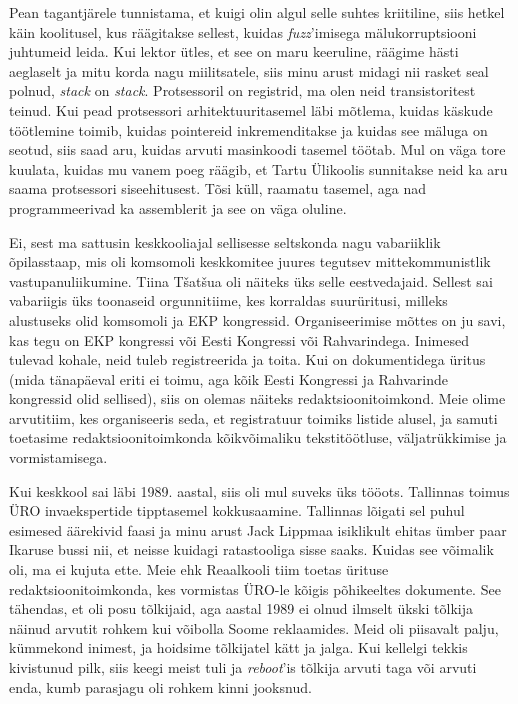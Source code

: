 Pean tagantjärele tunnistama, et kuigi olin algul selle suhtes 
kriitiline, siis hetkel käin koolitusel, kus räägitakse sellest, kuidas 
\emph{fuzz}'imisega 
mälukorruptsiooni juhtumeid leida. Kui lektor ütles, et see on maru keeruline, 
räägime hästi aeglaselt ja mitu korda nagu miilitsatele, siis minu arust midagi 
nii rasket seal polnud, \emph{stack} on \emph{stack}. Protsessoril on 
registrid, ma olen neid transistoritest teinud. Kui 
pead protsessori arhitektuuritasemel läbi mõtlema, kuidas käskude 
töötlemine toimib, kuidas pointereid inkremenditakse ja 
kuidas see mäluga on seotud, siis saad aru, kuidas arvuti 
masinkoodi tasemel töötab. Mul on väga tore kuulata, kuidas mu vanem poeg räägib, et
Tartu Ülikoolis sunnitakse neid ka aru saama protsessori siseehitusest. 
Tõsi küll, raamatu tasemel, aga nad programmeerivad ka assemblerit ja see on väga oluline. 


Ei, sest ma sattusin keskkooliajal sellisesse seltskonda nagu 
vabariiklik õpilasstaap, mis oli 
komsomoli keskkomitee juures tegutsev mittekommunistlik vastupanuliikumine. 
Tiina Tšatšua oli näiteks üks selle eestvedajaid. 
Sellest sai vabariigis üks toonaseid orgunnitiime, kes korraldas 
suurüritusi, milleks alustuseks olid komsomoli ja EKP kongressid. Organiseerimise
mõttes on ju savi, kas tegu on EKP kongressi või Eesti Kongressi või Rahvarindega. Inimesed tulevad kohale, neid tuleb 
registreerida ja toita. Kui on dokumentidega üritus (mida 
tänapäeval eriti ei toimu, aga kõik Eesti Kongressi ja Rahvarinde kongressid 
olid sellised), siis on olemas näiteks redaktsioonitoimkond. Meie olime 
arvutitiim, kes organiseeris seda, et registratuur toimiks 
listide alusel, ja samuti toetasime redaktsioonitoimkonda kõikvõimaliku 
tekstitöötluse, väljatrükkimise ja vormistamisega. 

Kui keskkool sai läbi 1989. aastal, siis oli mul suveks üks tööots. Tallinnas 
toimus ÜRO invaekspertide tipptasemel kokkusaamine. Tallinnas lõigati sel puhul esimesed äärekivid faasi ja minu 
arust Jack Lippmaa isiklikult ehitas ümber paar 
Ikaruse bussi nii, et neisse kuidagi ratastooliga sisse saaks. Kuidas see 
võimalik oli, ma ei kujuta ette. Meie ehk Reaalkooli tiim toetas ürituse 
redaktsioonitoimkonda, kes vormistas ÜRO-le kõigis põhikeeltes 
dokumente. See tähendas, et oli posu tõlkijaid, aga aastal 1989 ei olnud ilmselt ükski tõlkija näinud arvutit rohkem kui 
võibolla Soome reklaamides. Meid oli piisavalt palju, kümmekond inimest, ja hoidsime tõlkijatel kätt ja jalga. Kui kellelgi tekkis kivistunud pilk, siis 
keegi meist tuli ja \emph{reboot}'is tõlkija arvuti taga või arvuti enda, kumb 
parasjagu oli rohkem kinni jooksnud. 

